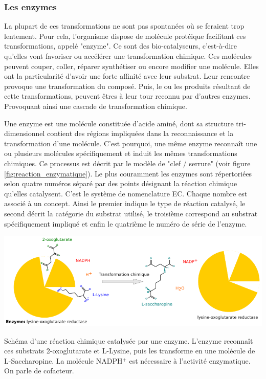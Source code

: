 \begin{refsegment}
    
    \subsubsection{Les enzymes}    
    La plupart de ces transformations ne sont pas spontanées où se feraient trop lentement. Pour cela, l'organisme dispose de molécule protéique facilitant ces transformations, appelé "enzyme". Ce sont des bio-catalyseurs, c'est-à-dire qu'elles vont favoriser ou accélérer une transformation chimique. Ces molécules peuvent couper, coller, réparer synthétiser ou encore modifier une molécule. Elles ont la particularité d'avoir une forte affinité avec leur substrat.  Leur rencontre provoque une transformation du composé. Puis, le ou les produits résultant de cette transformations, peuvent êtres à leur tour reconnu par d'autres enzymes. Provoquant ainsi une cascade de transformation chimique. 
    
    Une enzyme est une molécule constituée d'acide aminé, dont sa structure tri-dimensionnel contient des régions impliquées dans la reconnaissance et la transformation d’une molécule. C'est pourquoi, une même enzyme reconnaît une ou plusieurs molécules spécifiquement et induit les mêmes transformations chimiques. Ce processus est décrit par le modèle de "clef / serrure" (voir figure \ref{fig:reaction_enzymatique}). Le plus couramment les enzymes sont répertoriées selon quatre numéros séparé par des points désignant la réaction chimique qu'elles catalysent. C'est le système de nomenclature \gls{EC}. Chaque nombre est associé à un concept. Ainsi le premier indique le type de réaction catalysé,  le second décrit la catégorie du substrat utilisé, le troisième correspond au substrat spécifiquement impliqué et enfin le quatrième le numéro de série de l'enzyme.
    
    \begin{shadedfigure}
        \centering
        \includegraphics[width=\textwidth]{img/lysine-oxoglutarate_reductase.pdf}
        \caption{Schéma d'une réaction chimique catalysée par une enzyme. L'enzyme reconnaît ces substrats 2-oxoglutarate et L-Lysine, puis les transforme en une molécule de L-Saccharopine. La molécule NADPH$^{+}$ est nécessaire à l'activité enzymatique. On parle de cofacteur.}
        \label{fig:reaction_enzymatique}
    \end{shadedfigure}
    

\end{refsegment}
